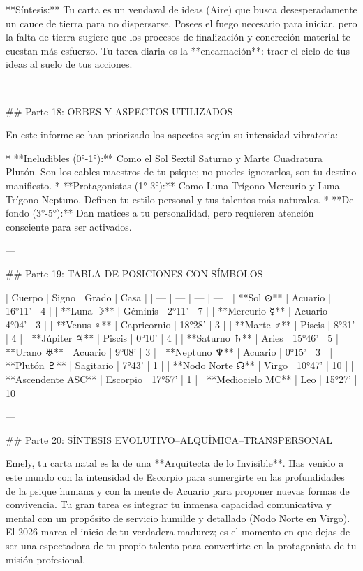 **Síntesis:**
Tu carta es un vendaval de ideas (Aire) que busca desesperadamente un cauce de tierra para no dispersarse. Posees el fuego necesario para iniciar, pero la falta de tierra sugiere que los procesos de finalización y concreción material te cuestan más esfuerzo. Tu tarea diaria es la **encarnación**: traer el cielo de tus ideas al suelo de tus acciones.

---

## Parte 18: ORBES Y ASPECTOS UTILIZADOS

En este informe se han priorizado los aspectos según su intensidad vibratoria:

* **Ineludibles (0°-1°):** Como el Sol Sextil Saturno y Marte Cuadratura Plutón. Son los cables maestros de tu psique; no puedes ignorarlos, son tu destino manifiesto.
* **Protagonistas (1°-3°):** Como Luna Trígono Mercurio y Luna Trígono Neptuno. Definen tu estilo personal y tus talentos más naturales.
* **De fondo (3°-5°):** Dan matices a tu personalidad, pero requieren atención consciente para ser activados.

---

## Parte 19: TABLA DE POSICIONES CON SÍMBOLOS

| Cuerpo | Signo | Grado | Casa |
| --- | --- | --- | --- |
| **Sol ⊙** | Acuario | 16°11' | 4 |
| **Luna ☽** | Géminis | 2°11' | 7 |
| **Mercurio ☿** | Acuario | 4°04' | 3 |
| **Venus ♀** | Capricornio | 18°28' | 3 |
| **Marte ♂** | Piscis | 8°31' | 4 |
| **Júpiter ♃** | Piscis | 0°10' | 4 |
| **Saturno ♄** | Aries | 15°46' | 5 |
| **Urano ♅** | Acuario | 9°08' | 3 |
| **Neptuno ♆** | Acuario | 0°15' | 3 |
| **Plutón ♇** | Sagitario | 7°43' | 1 |
| **Nodo Norte ☊** | Virgo | 10°47' | 10 |
| **Ascendente ASC** | Escorpio | 17°57' | 1 |
| **Mediocielo MC** | Leo | 15°27' | 10 |

---

## Parte 20: SÍNTESIS EVOLUTIVO–ALQUÍMICA–TRANSPERSONAL

Emely, tu carta natal es la de una **Arquitecta de lo Invisible**. Has venido a este mundo con la intensidad de Escorpio para sumergirte en las profundidades de la psique humana y con la mente de Acuario para proponer nuevas formas de convivencia. Tu gran tarea es integrar tu inmensa capacidad comunicativa y mental con un propósito de servicio humilde y detallado (Nodo Norte en Virgo). El 2026 marca el inicio de tu verdadera madurez; es el momento en que dejas de ser una espectadora de tu propio talento para convertirte en la protagonista de tu misión profesional.


